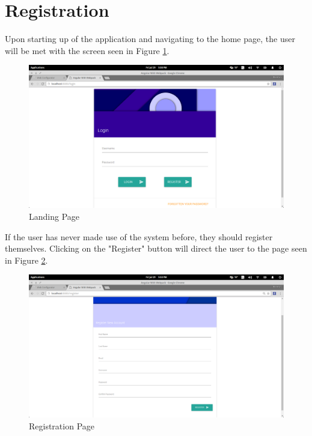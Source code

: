 \documentclass[11pt,a4paper]{article}
\begin{document}
\section{Registration}
Upon starting up of the application and navigating to the home page, the user will be met with the screen seen in 
Figure \ref{fig:landPage}.
\begin{figure}[H]
	\begin{center}
		\includegraphics[scale=0.6]{../Images/User Manual/Landing Page.png}
		\caption{Landing Page}
		\label{fig:landPage}
	\end{center}  
\end{figure}

If the user has never made use of the system before, they should register themselves. Clicking on the "Register"
button will direct the user to the page seen in Figure \ref{fig:regPage}.
\begin{figure}[H]
	\begin{center}
		\includegraphics[scale=0.6]{../Images/User Manual/Registration Page.png}
		\caption{Registration Page}
		\label{fig:regPage}
	\end{center}  
\end{figure}
\end{document}
